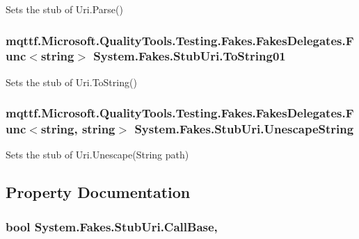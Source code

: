 Sets the stub of Uri.\-Parse()

\hypertarget{class_system_1_1_fakes_1_1_stub_uri_a4bb92fa7fc0cf302babe2dc653a92b85}{
\subsubsection[{To\-String01}]{\setlength{\rightskip}{0pt plus 5cm}mqttf.\-Microsoft.\-Quality\-Tools.\-Testing.\-Fakes.\-Fakes\-Delegates.\-Func$<$string$>$ System.\-Fakes.\-Stub\-Uri.\-To\-String01}}\label{class_system_1_1_fakes_1_1_stub_uri_a4bb92fa7fc0cf302babe2dc653a92b85}


Sets the stub of Uri.\-To\-String()

\hypertarget{class_system_1_1_fakes_1_1_stub_uri_a42185b9a50f0ba802df5ea350c3bee41}{
\subsubsection[{Unescape\-String}]{\setlength{\rightskip}{0pt plus 5cm}mqttf.\-Microsoft.\-Quality\-Tools.\-Testing.\-Fakes.\-Fakes\-Delegates.\-Func$<$string, string$>$ System.\-Fakes.\-Stub\-Uri.\-Unescape\-String}}\label{class_system_1_1_fakes_1_1_stub_uri_a42185b9a50f0ba802df5ea350c3bee41}


Sets the stub of Uri.\-Unescape(\-String path)



\subsection{Property Documentation}
\hypertarget{class_system_1_1_fakes_1_1_stub_uri_a1338831a3f46112e487ba7a266d5225f}{
\subsubsection[{Call\-Base}]{\setlength{\rightskip}{0pt plus 5cm}bool System.\-Fakes.\-Stub\-Uri.\-Call\-Base\hspace{0.3cm}{\ttfamily [get]}, {\ttfamily [set]}}}\label{class_system_1_1_fakes_1_1_stub_uri_a1338831a3f46112e487ba7a266d5225f}


